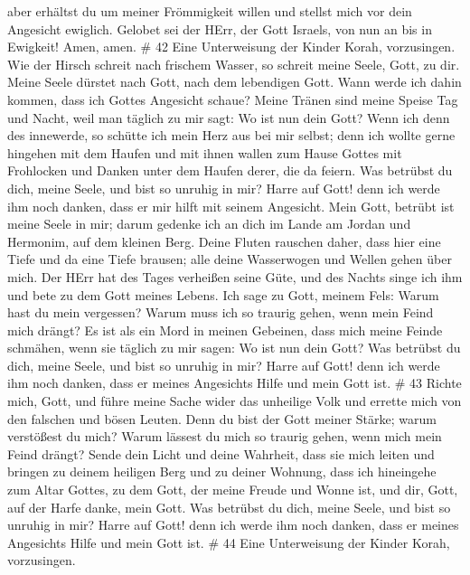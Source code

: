 aber erhältst du um meiner Frömmigkeit willen und stellst mich vor dein
Angesicht ewiglich.  Gelobet sei der HErr, der Gott
Israels, von nun an bis in Ewigkeit! Amen, amen. \# 42  Eine
Unterweisung der Kinder Korah, vorzusingen.  Wie der Hirsch
schreit nach frischem Wasser, so schreit meine Seele, Gott, zu dir.
 Meine Seele dürstet nach Gott, nach dem lebendigen Gott.
Wann werde ich dahin kommen, dass ich Gottes Angesicht schaue?
 Meine Tränen sind meine Speise Tag und Nacht, weil man
täglich zu mir sagt: Wo ist nun dein Gott?  Wenn ich denn
des innewerde, so schütte ich mein Herz aus bei mir selbst; denn ich
wollte gerne hingehen mit dem Haufen und mit ihnen wallen zum Hause
Gottes mit Frohlocken und Danken unter dem Haufen derer, die da feiern.
 Was betrübst du dich, meine Seele, und bist so unruhig in
mir? Harre auf Gott! denn ich werde ihm noch danken, dass er mir hilft
mit seinem Angesicht.  Mein Gott, betrübt ist meine Seele in
mir; darum gedenke ich an dich im Lande am Jordan und Hermonim, auf dem
kleinen Berg.  Deine Fluten rauschen daher, dass hier eine
Tiefe und da eine Tiefe brausen; alle deine Wasserwogen und Wellen gehen
über mich.  Der HErr hat des Tages verheißen seine Güte, und
des Nachts singe ich ihm und bete zu dem Gott meines Lebens.
 Ich sage zu Gott, meinem Fels: Warum hast du mein
vergessen? Warum muss ich so traurig gehen, wenn mein Feind mich drängt?
 Es ist als ein Mord in meinen Gebeinen, dass mich meine
Feinde schmähen, wenn sie täglich zu mir sagen: Wo ist nun dein Gott?
 Was betrübst du dich, meine Seele, und bist so unruhig in
mir? Harre auf Gott! denn ich werde ihm noch danken, dass er meines
Angesichts Hilfe und mein Gott ist. \# 43  Richte mich,
Gott, und führe meine Sache wider das unheilige Volk und errette mich
von den falschen und bösen Leuten.  Denn du bist der Gott
meiner Stärke; warum verstößest du mich? Warum lässest du mich so
traurig gehen, wenn mich mein Feind drängt?  Sende dein
Licht und deine Wahrheit, dass sie mich leiten und bringen zu deinem
heiligen Berg und zu deiner Wohnung,  dass ich hineingehe
zum Altar Gottes, zu dem Gott, der meine Freude und Wonne ist, und dir,
Gott, auf der Harfe danke, mein Gott.  Was betrübst du dich,
meine Seele, und bist so unruhig in mir? Harre auf Gott! denn ich werde
ihm noch danken, dass er meines Angesichts Hilfe und mein Gott ist. \#
44  Eine Unterweisung der Kinder Korah, vorzusingen.
